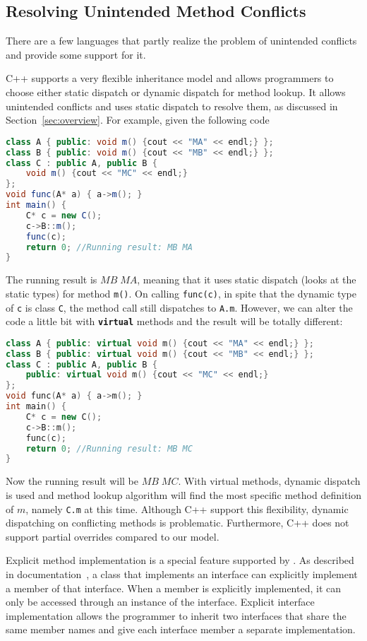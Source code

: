 \subsection{Resolving Unintended Method Conflicts}
There are a few languages that partly realize the problem of
unintended conflicts and provide some support for it.

C++ supports a very flexible inheritance model and allows programmers to choose either static dispatch or dynamic dispatch for method lookup.
It allows unintended conflicts and uses static dispatch to resolve them, as discussed in Section~\ref{sec:overview}. For example, given the following code
\begin{lstlisting}[language=Java]
class A { public: void m() {cout << "MA" << endl;} };
class B { public: void m() {cout << "MB" << endl;} };
class C : public A, public B { 
	void m() {cout << "MC" << endl;}
};
void func(A* a) { a->m(); }
int main() {
	C* c = new C();
	c->B::m();
	func(c); 
	return 0; //Running result: MB MA
}
\end{lstlisting}
The running result is $MB \; MA$, meaning that it uses static dispatch (looks at the static types) for method \lstinline|m()|. 
On calling \texttt{func(c)}, in spite that the dynamic type of \texttt{c} is class \texttt{C}, the method call still dispatches to 
\lstinline|A.m|.
However, we can alter the code a little bit with \textbf{\texttt{virtual}} methods and the result will be totally different:
\begin{lstlisting}[language=c++]
class A { public: virtual void m() {cout << "MA" << endl;} };
class B { public: virtual void m() {cout << "MB" << endl;} };
class C : public A, public B { 
    public: virtual void m() {cout << "MC" << endl;}
};
void func(A* a) { a->m(); }
int main() {
	C* c = new C();
	c->B::m();
	func(c); 
	return 0; //Running result: MB MC
}
\end{lstlisting}
Now the running result will be $MB \; MC$. With virtual methods, dynamic dispatch is used and 
method lookup algorithm will find the most specific method definition of $m$, namely \lstinline|C.m| at this time.
Although C++ support this flexibility, dynamic dispatching on
conflicting methods is problematic.
Furthermore, C++ does not support partial overrides compared to our
model.

Explicit method implementation is a special feature supported by
\csharp{}. As described in \csharp{} documentation~\cite{csharpdoc}, a
class that implements an interface can explicitly implement a member
of that interface. When a member is explicitly implemented, it can
only be accessed through an instance of the interface. Explicit
interface implementation allows the programmer to inherit two
interfaces that share the same member names and give each interface
member a separate implementation.

